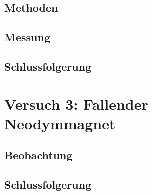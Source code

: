 \documentclass[11pt,a4paper,titlepage, ngerman]{article}
\begin{document}
		\subsection*{Methoden} 
		
			
			
					
		\subsection*{Messung}
			
			
			
		\subsection*{Schlussfolgerung}	
			
			
		
	\section{Versuch 3: Fallender Neodymmagnet}		
	
		
		
		\subsection*{Beobachtung}
			
			
			
		\subsection*{Schlussfolgerung}	
		
			
					
\end{document}
